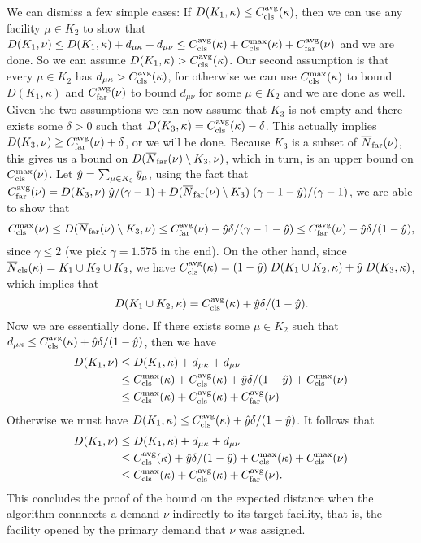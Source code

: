 We can dismiss a few simple cases: If $D(K_1, \kappa) \leq
C_{\text{cls}}^{{\mbox{\scriptsize\rm avg}}}(\kappa)$, then we can use any facility $\mu \in K_2$ to show
that $D(K_1,\nu) \leq D(K_1, \kappa) + d_{\mu\kappa} + d_{\mu\nu} \leq
C_{\text{cls}}^{{\mbox{\scriptsize\rm avg}}}(\kappa) + C_{\text{cls}}^{\max}(\kappa) + C_{\text{far}}^{{\mbox{\scriptsize\rm avg}}}(\nu)$ and we are
done. So we can assume $D(K_1, \kappa) > C_{\text{cls}}^{{\mbox{\scriptsize\rm avg}}}(\kappa)$. Our second
assumption is that every $\mu \in K_2$ has $d_{\mu\kappa} >
C_{\text{cls}}^{{\mbox{\scriptsize\rm avg}}}(\kappa)$, for otherwise we can use $C_{\text{cls}}^{\max}(\kappa)$ to bound
$D(K_1, \kappa)$ and $C_{\text{far}}^{{\mbox{\scriptsize\rm avg}}}(\nu)$ to bound $d_{\mu\nu}$ for some
$\mu\in K_2$ and we are done as well. Given the two assumptions we can
now assume that $K_3$ is not empty and there exists some $\delta > 0$
such that $D(K_3, \kappa) = C_{\text{cls}}^{{\mbox{\scriptsize\rm avg}}}(\kappa) - \delta$. This actually
implies $D(K_3, \nu) \geq C_{\text{far}}^{{\mbox{\scriptsize\rm avg}}}(\nu) + \delta$, or we will be
done. Because $K_3$ is a subset of ${\overline{N}}_{\text{far}}(\nu)$, this gives us a
bound on $D({\overline{N}}_{\text{far}}(\nu) \setminus K_3, \nu)$, which in turn, is an
upper bound on $C_{\text{cls}}^{\max}(\nu)$. Let $\hat{y} = \sum_{\mu\in K_3}
{\bar y}_{\mu}$, using the fact that $C_{\text{far}}^{{\mbox{\scriptsize\rm avg}}}(\nu) =
D(K_3,\nu)\; \hat{y}/(\gamma-1) + D({\overline{N}}_{\text{far}}(\nu)\setminus
K_3)\; (\gamma-1-\hat{y})/(\gamma-1)$, we are able to show that
\begin{equation*}
  C_{\text{cls}}^{\max}(\nu) \leq D({\overline{N}}_{\text{far}}(\nu) \setminus K_3, \nu) \leq C_{\text{far}}^{{\mbox{\scriptsize\rm avg}}}(\nu) -
  \hat{y}\delta/(\gamma-1-\hat{y}) \leq C_{\text{far}}^{{\mbox{\scriptsize\rm avg}}}(\nu) -
  \hat{y}\delta/(1-\hat{y}),
\end{equation*}
since $\gamma \leq 2$ (we pick $\gamma=1.575$ in the end). On the
other hand, since ${\overline{N}}_{\text{cls}}(\kappa) = K_1 \cup K_2 \cup K_3$, we
have $C_{\text{cls}}^{{\mbox{\scriptsize\rm avg}}}(\kappa) = (1-\hat{y})\; D(K_1\cup K_2, \kappa) + \hat{y}\;
D(K_3, \kappa)$, which implies that
\begin{equation*}
  D(K_1 \cup K_2, \kappa) = C_{\text{cls}}^{{\mbox{\scriptsize\rm avg}}}(\kappa) + \hat{y}\delta/(1-\hat{y}).
\end{equation*}
Now we are essentially done. If there exists some $\mu \in K_2$ such
that $d_{\mu\kappa} \leq C_{\text{cls}}^{{\mbox{\scriptsize\rm avg}}}(\kappa) +
\hat{y}\delta/(1-\hat{y})$, then we have
\begin{align*}
  D(K_1, \nu) &\leq D(K_1, \kappa) + d_{\mu\kappa} + d_{\mu\nu} \\
  &\leq C_{\text{cls}}^{\max}(\kappa) + C_{\text{cls}}^{{\mbox{\scriptsize\rm avg}}}(\kappa) + \hat{y}\delta/(1-\hat{y})
  + C_{\text{cls}}^{\max}(\nu)\\
  &\leq C_{\text{cls}}^{\max}(\kappa) + C_{\text{cls}}^{{\mbox{\scriptsize\rm avg}}}(\kappa) + C_{\text{far}}^{{\mbox{\scriptsize\rm avg}}}(\nu)
\end{align*}
Otherwise we must have $D(K_1, \kappa) \leq C_{\text{cls}}^{{\mbox{\scriptsize\rm avg}}}(\kappa) +
\hat{y}\delta/(1-\hat{y})$. It follows that
\begin{align*}
  D(K_1, \nu) &\leq D(K_1, \kappa) + d_{\mu\kappa} + d_{\mu\nu} \\
  &\leq C_{\text{cls}}^{{\mbox{\scriptsize\rm avg}}}(\kappa) + \hat{y}\delta/(1-\hat{y}) + C_{\text{cls}}^{\max}(\kappa)
  + C_{\text{cls}}^{\max}(\nu)\\
  &\leq C_{\text{cls}}^{\max}(\kappa) + C_{\text{cls}}^{{\mbox{\scriptsize\rm avg}}}(\kappa) + C_{\text{far}}^{{\mbox{\scriptsize\rm avg}}}(\nu).
\end{align*}
This concludes the proof of the bound on the expected distance when
the algorithm connnects a demand $\nu$ indirectly to its target
facility, that is, the facility opened by the primary demand that
$\nu$ was assigned.

